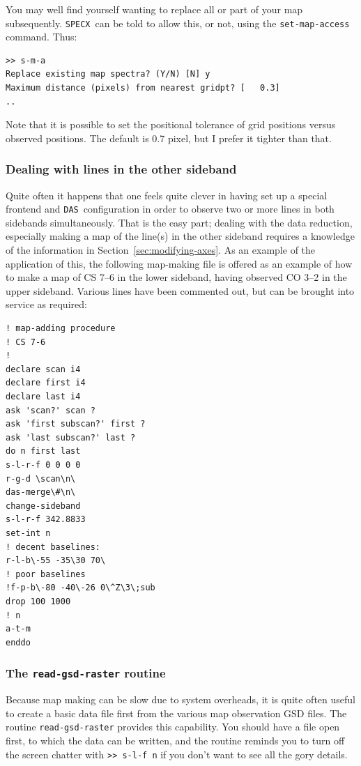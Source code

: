 \documentclass[11pt,twoside]{article}
\newcommand{\SPECX}{{\tt SPECX}}
\newcommand{\das}{{\tt DAS}}
\begin{document}
You may well find yourself wanting to replace all or part of your map
subsequently. \SPECX\ can be told to allow this, or not, using the
{\tt set-map-access} command. Thus:
\begin{verbatim}
>> s-m-a
Replace existing map spectra? (Y/N) [N] y
Maximum distance (pixels) from nearest gridpt? [   0.3]
..
\end{verbatim}
Note that it is possible to set the positional tolerance of grid
positions versus observed positions. The default is 0.7 pixel, but I
prefer it tighter than that.

\subsubsection{Dealing with lines in the other sideband}
\label{sec:other-sideband-maps}
Quite often it happens that one feels quite clever in having set up a
special frontend and \das\ configuration in order to observe two or
more lines in both sidebands simultaneously. That is the easy part;
dealing with the data reduction, especially making a map of the
line(s) in the other sideband requires a knowledge of the information
in Section~\ref{sec:modifying-axes}. As an example of the application
of this, the following map-making file is offered as an example of how
to make a map of CS 7--6 in the lower sideband, having observed CO
3--2 in the upper sideband. Various lines have been commented out, but
can be brought into service as required:
\begin{verbatim}
! map-adding procedure
! CS 7-6 
! 
declare scan i4
declare first i4
declare last i4
ask 'scan?' scan ?
ask 'first subscan?' first ?
ask 'last subscan?' last ?
do n first last
s-l-r-f 0 0 0 0
r-g-d \scan\n\
das-merge\#\n\
change-sideband
s-l-r-f 342.8833
set-int n
! decent baselines:
r-l-b\-55 -35\30 70\
! poor baselines
!f-p-b\-80 -40\-26 0\^Z\3\;sub
drop 100 1000
! n
a-t-m
enddo
\end{verbatim} 

\subsubsection{The {\tt read-gsd-raster} routine}
\label{sec:r-g-r}
Because map making can be slow due to system overheads, it is quite
often useful to create a basic data file first from the various map
observation GSD files. The routine {\tt read-gsd-raster} provides this
capability. You should have a file open first, to which the data can 
be written, and the routine reminds you to turn off the screen chatter
with \verb|>> s-l-f n| if you don't want to see all the gory details.
\end{document}
